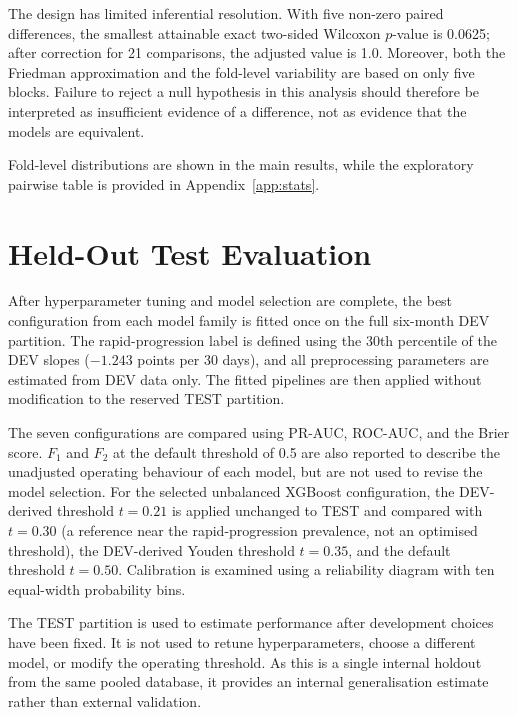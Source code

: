 The design has limited inferential resolution. With five non-zero paired differences, the smallest attainable exact two-sided Wilcoxon $p$-value is 0.0625; after correction for 21 comparisons, the adjusted value is 1.0. Moreover, both the Friedman approximation and the fold-level variability are based on only five blocks. Failure to reject a null hypothesis in this analysis should therefore be interpreted as insufficient evidence of a difference, not as evidence that the models are equivalent.

Fold-level distributions are shown in the main results, while the exploratory pairwise table is provided in Appendix~\ref{app:stats}.

\section{Held-Out Test Evaluation}
\label{sec:methods_test_evaluation}
After hyperparameter tuning and model selection are complete, the best configuration from each model family is fitted once on the full six-month \gls{DEV} partition. The rapid-progression label is defined using the 30th percentile of the DEV slopes ($-1.243$ points per 30 days), and all preprocessing parameters are estimated from DEV data only. The fitted pipelines are then applied without modification to the reserved \gls{TEST} partition.

The seven configurations are compared using \gls{PR-AUC}, \gls{ROC-AUC}, and the Brier score. $F_1$ and $F_2$ at the default threshold of 0.5 are also reported to describe the unadjusted operating behaviour of each model, but are not used to revise the model selection. For the selected unbalanced XGBoost configuration, the DEV-derived threshold $t=0.21$ is applied unchanged to TEST and compared with $t=0.30$ (a reference near the rapid-progression prevalence, not an optimised threshold), the DEV-derived Youden threshold $t=0.35$, and the default threshold $t=0.50$. Calibration is examined using a reliability diagram with ten equal-width probability bins.

The TEST partition is used to estimate performance after development choices have been fixed. It is not used to retune hyperparameters, choose a different model, or modify the operating threshold. As this is a single internal holdout from the same pooled database, it provides an internal generalisation estimate rather than external validation.

